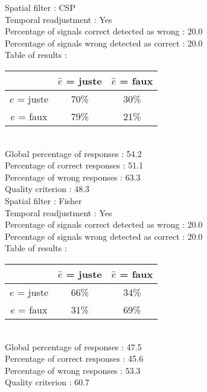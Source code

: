 Spatial filter : CSP \\
Temporal readjustment : Yes \\
Percentage of signals correct detected as wrong :   20.0 \\
Percentage of signals wrong detected as correct :   20.0 \\
Table of results : \\
\begin{tabular}{|c|c|c|}
\hline				& $\hat{e}$ = juste & $\hat{e}$ = faux \\
\hline  $e$ = juste	&     70\%			&     30\%		\\
\hline  $e$ = faux	&     79\%			&     21\%		\\
\hline
\end{tabular}\\
Global percentage of responses :   54.2 \\
Percentage of correct responses :   51.1 \\
Percentage of wrong responses :   63.3 \\
Quality criterion :   48.3 \\

Spatial filter : Fisher \\
Temporal readjustment : Yes \\
Percentage of signals correct detected as wrong :   20.0 \\
Percentage of signals wrong detected as correct :   20.0 \\
Table of results : \\
\begin{tabular}{|c|c|c|}
\hline				& $\hat{e}$ = juste & $\hat{e}$ = faux \\
\hline  $e$ = juste	&     66\%			&     34\%		\\
\hline  $e$ = faux	&     31\%			&     69\%		\\
\hline
\end{tabular}\\
Global percentage of responses :   47.5 \\
Percentage of correct responses :   45.6 \\
Percentage of wrong responses :   53.3 \\
Quality criterion :   60.7 \\

